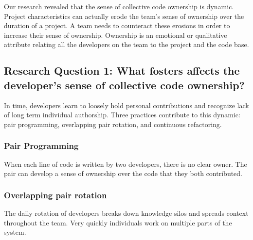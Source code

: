 Our research revealed that the sense of collective code ownership is dynamic. Project characteristics can actually erode the team's sense of ownership over the duration of a project. A team needs to counteract these erosions in order to increase their sense of ownership. Ownership is an emotional or qualitative attribute relating all the developers on the team to the project and the code base.




\subsection{Research Question 1: What fosters affects the developer's sense of collective code ownership?}
In time, developers learn to loosely hold personal contributions and recognize lack of long term individual authorship. Three practices contribute to this dynamic: pair programming, overlapping pair rotation, and continuous refactoring.

\subsubsection{Pair Programming}
When each line of code is written by two developers, there is no clear owner. The pair can develop a sense of ownership over the code that they both contributed.

\subsubsection{Overlapping pair rotation}
The daily rotation of developers breaks down knowledge silos and spreads context throughout the team. Very quickly individuals work on multiple parts of the system. 

